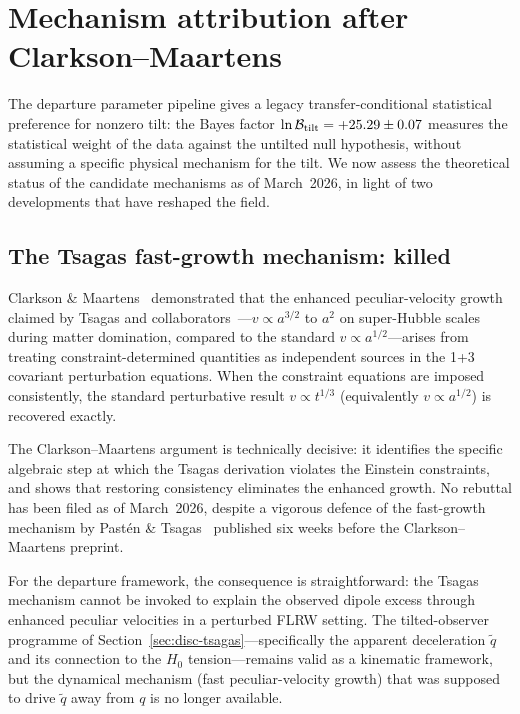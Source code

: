 \section{Mechanism attribution after Clarkson--Maartens}
\label{sec:disc-mechanisms}

The departure parameter pipeline gives a
legacy transfer-conditional statistical preference for nonzero tilt:
the Bayes
factor $\ln \mathcal{B}_{\rm tilt} = +25.29 \pm 0.07$
measures the statistical weight of the data against the
untilted null hypothesis, without assuming a specific
physical mechanism for the tilt.  We now assess the
theoretical status of the candidate mechanisms as of
March~2026, in light of two developments that have
reshaped the field.


\subsection{The Tsagas fast-growth mechanism: killed}
\label{sec:disc-tsagas-killed}

Clarkson \& Maartens~\cite{ClarksonMaartens2026}
demonstrated that the enhanced peculiar-velocity growth
claimed by Tsagas and
collaborators~\cite{Tsagas2010,TsagasKadiltzoglou2013}---$v
\propto a^{3/2}$ to $a^2$ on super-Hubble scales during
matter domination, compared to the standard $v \propto
a^{1/2}$---arises from treating constraint-determined
quantities as independent sources in the 1+3 covariant
perturbation equations.  When the constraint equations are
imposed consistently, the standard perturbative result
$v \propto t^{1/3}$ (equivalently $v \propto a^{1/2}$)
is recovered exactly.

The Clarkson--Maartens argument is technically decisive: it
identifies the specific algebraic step at which the Tsagas
derivation violates the Einstein constraints, and shows
that restoring consistency eliminates the enhanced growth.
No rebuttal has been filed as of March~2026, despite a
vigorous defence of the fast-growth mechanism by
Past{\'e}n \& Tsagas~\cite{PastenTsagas2026} published
six weeks before the Clarkson--Maartens preprint.

For the departure framework, the consequence is
straightforward: the Tsagas mechanism cannot be invoked to
explain the observed dipole excess through enhanced
peculiar velocities in a perturbed FLRW setting.  The
tilted-observer programme of
Section~\ref{sec:disc-tsagas}---specifically the apparent
deceleration $\tilde{q}$ and its connection to the
$H_0$ tension---remains valid as a kinematic framework,
but the dynamical mechanism (fast peculiar-velocity
growth) that was supposed to drive $\tilde{q}$ away
from $q$ is no longer available.



